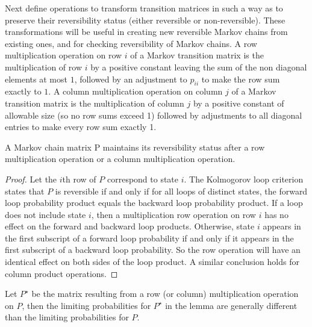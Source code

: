\documentclass[12pt]{article}
\begin{document}
Next define operations to transform transition matrices in such a way as to
preserve their reversibility status (either reversible or
non-reversible). These
transformations will be useful in creating new reversible Markov chains from existing
ones, and for checking reversibility of Markov chains.
A row multiplication operation on row $i$ of a Markov transition
matrix is the multiplication of row $i$ by a positive constant leaving the sum
of the non diagonal elements at most $1$, followed by an adjustment to $p_{ii}$ to make
the row sum exactly to $1$.
A column multiplication operation on column $j$ of a Markov transition matrix is the multiplication of column $j$ by a positive constant of allowable
size (so no row sums exceed 1) followed by adjustments to all diagonal entries to
make every row sum exactly 1.

\begin{lemma}
  A Markov chain matrix P maintains its reversibility status after
a row multiplication operation or a column multiplication operation.
\end{lemma}

\begin{proof}
  Let the $i$th row of $P$ correspond to state $i$. The Kolmogorov
  loop criterion states
that $P$ is reversible if and only if for all loops of distinct states, the forward loop probability
product equals the backward loop probability product. If a loop does not include
state $i$, then a multiplication row operation on row $i$ has no effect on
the forward
and backward loop products. Otherwise, state $i$ appears in the first
subscript of a forward loop probability if and only if it appears in the first subscript of a
backward loop probability. So the row operation will have an identical effect on
both sides of the loop product. A similar conclusion holds for column product
operations.
\end{proof}

\begin{remark}
  Let $P^{\star}$ be the matrix resulting from a row (or column) multiplication operation on $P$, then the limiting probabilities for $P^{\star}$ in the lemma
are generally different than the limiting probabilities for $P$. 
\end{remark}
\end{document}
